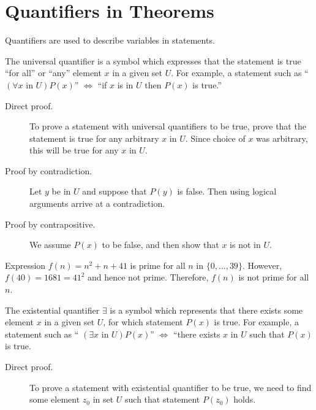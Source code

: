 \documentclass[a4paper,english,12pt]{article}
\begin{document}
\section{ Quantifiers in Theorems}
Quantifiers are used to describe variables in statements. 
\begin{defn} The universal quantifier is a symbol which expresses that the statement is true  ``for all'' or ``any'' element $x$ in a given set $U$. For example, a statement such as `` $(\forall x\text{ in } U)P(x)$'' $\Longleftrightarrow$ ``if $x$ is  in $U$ then $P(x)$ is true.''  
\end{defn}
\begin{description}
	\item[Direct proof.] To prove a statement with universal quantifiers to be true, prove that the statement is true for any arbitrary $x$ in $U$. Since choice of $x$ was arbitrary, this will be true for any $x$ in $U$. 
	\item[Proof by contradiction.] Let $y$ be in $U$ and suppose that $P(y)$ is false. Then using logical arguments arrive at a contradiction.
	\item[Proof by contrapositive.] We assume $P(x)$ to be false, and then show that $x$ is not in $U$.
\end{description}
\begin{exmp} Expression $f(n) = n^2+n+41$ is prime for all $n$ in $\{0,\ldots, 39\}$. However, $f(40) = 1681 = 41^2$ and hence not prime. Therefore, $f(n)$ is not prime for all $n$.
\end{exmp}

\begin{defn} The existential quantifier $\exists$ is a symbol which represents that there exists some element $x$ in a given set $U$, for which statement $P(x)$ is true. For example, a statement such as `` $(\exists x\text{ in } U)P(x)$'' $\Longleftrightarrow$  ``there exists $x$ in $U$ such that $P(x)$ is true.
\end{defn}

\begin{description}
	\item[Direct proof.] To prove a statement with existential quantifier to be true, we need to find some element $z_0$ in set $U$ such that statement $P(z_0)$ holds.
\end{description}
\end{document}
